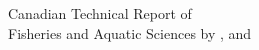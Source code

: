 \normalsize
{}
\thispagestyle{empty}
\noindent
\begin{center}
Canadian Technical Report of\\
Fisheries and Aquatic Sciences \trReportNum{}
\vfill
\trYear{}
\vfill
\trTitle{}
\vfill
by
\vfill
\trAuthALong{}, and \trAuthBLong{}
\vfill
\trAddy{}
\end{center}
\clearpage
